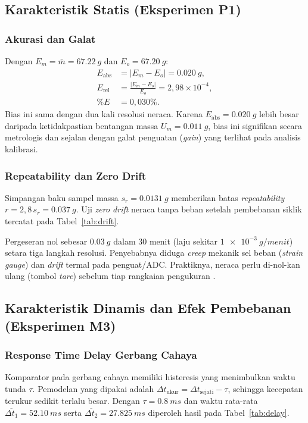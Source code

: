 \documentclass[a4paper, 12pt]{article}
\begin{document}
\subsection{Karakteristik Statis (Eksperimen P1)}
            \subsubsection{Akurasi dan Galat}
            Dengan $E_m=\bar{m}=\SI{67,22}{g}$ dan $E_o=\SI{67,20}{g}$:
            \begin{align}
                E_{\mathrm{abs}} &= |E_m-E_o|=\SI{0,020}{g},\\
                E_{\mathrm{rel}} &= \frac{|E_m-E_o|}{E_o}=2{,}98\times10^{-4},\\
                \%E &= 0{,}030\%.
            \end{align}
            Bias ini sama dengan dua kali resolusi neraca. Karena $E_{\mathrm{abs}}=\SI{0,020}{g}$ lebih besar daripada ketidakpastian bentangan massa $U_m=\SI{0,011}{g}$, bias ini signifikan secara metrologis dan sejalan dengan galat penguatan (\textit{gain}) yang terlihat pada analisis kalibrasi.

            \subsubsection{Repeatability dan Zero Drift}
            Simpangan baku sampel massa $s_r=\SI{0,0131}{g}$ memberikan batas \textit{repeatability} $r=2{,}8\,s_r=\SI{0,037}{g}$. Uji \textit{zero drift} neraca tanpa beban setelah pembebanan siklik tercatat pada Tabel~\ref{tab:drift}.

            Pergeseran nol sebesar $\SI{0,03}{g}$ dalam $30$ menit (laju sekitar $\SI{1e-3}{g/menit}$) setara tiga langkah resolusi. Penyebabnya diduga \textit{creep} mekanik sel beban (\textit{strain gauge}) dan \textit{drift} termal pada penguat/ADC. Praktiknya, neraca perlu di-nol-kan ulang (tombol \textit{tare}) sebelum tiap rangkaian pengukuran \parencite{MorrisLangari}.

        \subsection{Karakteristik Dinamis dan Efek Pembebanan (Eksperimen M3)}
            \subsubsection{Response Time Delay Gerbang Cahaya}
            Komparator pada gerbang cahaya memiliki histeresis yang menimbulkan waktu tunda $\tau$. Pemodelan yang dipakai adalah $\Delta t_{\mathrm{ukur}}=\Delta t_{\mathrm{sejati}}-\tau$, sehingga kecepatan terukur sedikit terlalu besar. Dengan $\tau=\SI{0,8}{ms}$ dan waktu rata-rata $\overline{\Delta t_1}=\SI{52,10}{ms}$ serta $\overline{\Delta t_2}=\SI{27,825}{ms}$ diperoleh hasil pada Tabel~\ref{tab:delay}.
\end{document}
